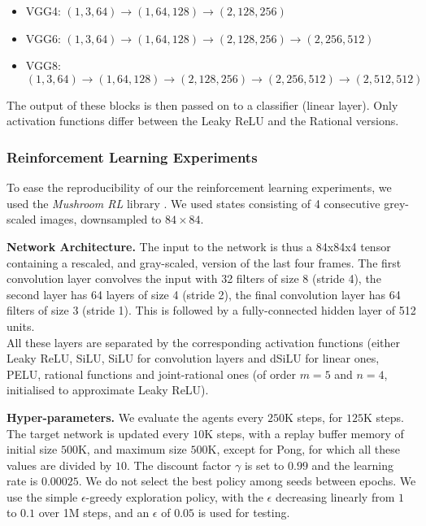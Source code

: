 \documentclass[accepted]{article}
\theoremstyle{plain}
\theoremstyle{definition}
\theoremstyle{remark}
\begin{document}
\begin{itemize}
    \item VGG4: $(1, 3, 64) \xrightarrow{} (1, 64, 128) \xrightarrow{} (2, 128, 256)$
    \item VGG6: $(1, 3, 64) \xrightarrow{} (1, 64, 128) \xrightarrow{} (2, 128, 256) \xrightarrow{} (2, 256, 512)$
    \item VGG8: $(1, 3, 64) \xrightarrow{} (1, 64, 128) \xrightarrow{} (2, 128, 256) \xrightarrow{} (2, 256, 512) \xrightarrow{} (2, 512, 512)$
\end{itemize}

The output of these blocks is then passed on to a classifier (linear layer). Only activation functions differ between the Leaky ReLU and the Rational versions.

\subsubsection{Reinforcement Learning Experiments}
\label{app:details_rl}
To ease the reproducibility of our the reinforcement learning experiments, we used the \textit{Mushroom RL} library \citep{deramo2020mushroomrl}. We used states consisting of 4 consecutive grey-scaled images, downsampled to $84\times84$.

\textbf{Network Architecture.}
The input to the network is thus a 84x84x4 tensor containing a rescaled, and gray-scaled, version of the last four frames. The first convolution layer convolves the input with 32 filters of size 8 (stride 4), the second layer has 64 layers of size 4 (stride 2), the final convolution layer has 64 filters of size 3 (stride 1). This is followed by a fully-connected hidden layer of 512 units. \\
All these layers are separated by the corresponding activation functions (either Leaky ReLU, SiLU, SiLU for convolution layers and dSiLU for linear ones, PELU, rational functions and joint-rational ones (of order $m=5$ and $n = 4$, initialised to approximate Leaky ReLU). 

\textbf{Hyper-parameters.}
We evaluate the agents every $250$K steps, for $125$K steps. The target network is updated every $10$K steps, with a replay buffer memory of initial size $500$K, and maximum size $500$K, except for Pong, for which all these values are divided by $10$. The discount factor $\gamma$ is set to $0.99$ and the learning rate is $0.00025$. We do not select the best policy among seeds between epochs. We use the simple $\epsilon$-greedy exploration policy, with the $\epsilon$ decreasing linearly from $1$ to $0.1$ over 1M steps, and an $\epsilon$ of $0.05$ is used for testing.
\end{document}
